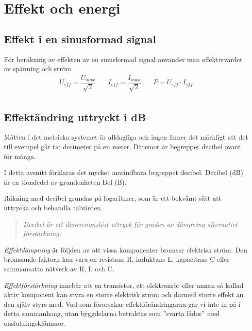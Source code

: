 \section{Effekt och energi}
\label{effect och energi}

\subsection{Effekt i en sinusformad signal}

För beräkning av effekten av en sinusformad signal använder man effektivvärdet
av spänning och ström.
\[\begin{array}{ccc}
    U_{\textit{eff}} = \dfrac{U_{max}}{\sqrt{2}} &
    \quad I_{\textit{eff}} = \dfrac{I_{max}}{\sqrt{2}} &
    \quad P = U_{\textit{eff}} \cdot I_{\textit{eff}} \\
    \end{array}\]


\subsection{Effektändring uttryckt i dB}
\label{decibel}
\label{effekt_db}

Måtten i det metriska systemet är alldagliga och ingen finner det märkligt att
det till exempel går tio decimeter på en meter.
Däremot är begreppet decibel ovant för många.

I detta avsnitt förklaras det mycket användbara begreppet decibel.
Decibel (dB) är en tiondedel av grundenheten Bel (B).

Räkning med decibel grundas på logaritmer, som är ett bekvämt sätt att uttrycka
och behandla talvärden.

\begin{quote}\emph{
Decibel är ett dimensionslöst uttryck för graden av dämpning alternativt
förstärkning.
}\end{quote}

\emph{Effektdämpning} är följden av att vissa komponenter bromsar elektrisk
ström.
Den bromsande faktorn kan vara en resistans R, induktans L, kapacitans C eller
sammansatta nätverk av R, L och C.

\emph{Effektförstärkning} innebär att en transistor, ett elektronrör eller
annan så kallad aktiv komponent kan styra en större elektrisk ström och därmed
större effekt än den själv styrs med.
Vad som förorsakar effektförändringarna går vi inte in på i detta sammanhang,
utan byggdelarna betraktas som ''svarta lådor'' med anslutningsklämmor.

